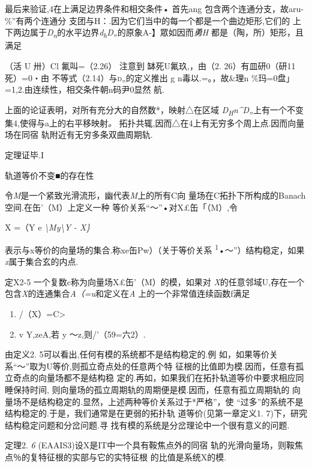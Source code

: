 \documentclass{article}
\begin{document}
最后来验证,4在上满足边界条件和相交条件• 首先ang
包含两个连通分支，故aru-\%''有两个连通分
支团与H：.因为它们当中的每一个都是一个曲边矩形,它们的
上下两边属于\emph{D\textsubscript{n}}的水平边界\emph{d\textsubscript{h}D„}的原象A-】眾如因而\emph{勇H}
都是（陶，所）矩形，且满足

（活 U 卅）Cl 氟叫=（2.26） 注意到 缽死U氟玖,，由（2.
26）有皿研0（研11死）=0・由 不等式（2.14）与\textsc{d„}的定义推出 g
n毒以.=。，故\&理n \%玛=0盘」=1,2.由连续性，相交条件朝n码尹0显然 航.

上面的论证表明，对所有充分大的自然数*，映射△在区域
\emph{D\textsubscript{H}n\^{}D„}上有一个不变集4,使得与a上的右平移映射\emph{。}
拓扑共辄,因而△在4上有无穷多个周上点.因而向量场在同宿
轨附近有无穷多条双曲周期轨.

定理证毕.I

轨道等价不变■的存在性

令\emph{M}是一个紧致光滑流形，幽代表\emph{M}上的所有C向
量场在C拓扑下所构成的Banach空间.在缶'（M）上定义一种
等价关系``〜''•对X£缶「（M）,令

X =（Y e \emph{\textbackslash{}My\textbackslash{}Y - X\}}

表示与x等价的向量场的集合.称xe缶Pw）（关于等价关系
\textsuperscript{1}•〜''）结构稳定，如果\emph{x}属于集合玄的内点.

定X2-5 一个复数c称为向量场X£缶'（M）的模，如果对
\emph{X}的任意邻域U,存在一个包含\emph{X}的连通集合\emph{A（=u}和定义在\emph{A}
上的一个非常值连续函数f满足

\begin{enumerate}
\def\labelenumi{\arabic{enumi}.}
\item
  /（X）=C\textgreater{}
\item
  v Y,zeA,若 y 〜z,则/'（59=六2）.
\end{enumerate}

由定义2. 5可以看出,任何有模的系统都不是结构稳定的.例
如，如果等价关系``〜''取为U等价,则孤立奇点处的任意两个特
征根的比值即为模.因而，任意有孤立奇点的向量场都不是结构稳
定的.再如，如果我们在拓扑轨道等价中要求相应同睡保持时间,
则向量场的孤立周期轨的周期便是模.因而，任意有孤立周期轨的
向量场不是结构稳定的.显然，上述两种等价关系过于*严格''，使
``过多''的系统不是结构稳定的.于是，我们通常是在更弱的拓扑轨
道等价(见第一章定义1. 7)下，研究结构稳定问题和分岔问题.寻
找有模的系统是分岔理论中一个很有意义的问题.

定理2. \emph{6} (EAAIS3)设X是IT中一个具有鞍焦点外的同宿
轨的光滑向量场，则鞍焦点％的复特征根的实部与它的实特征根
的比值是系统X的模.
\end{document}
